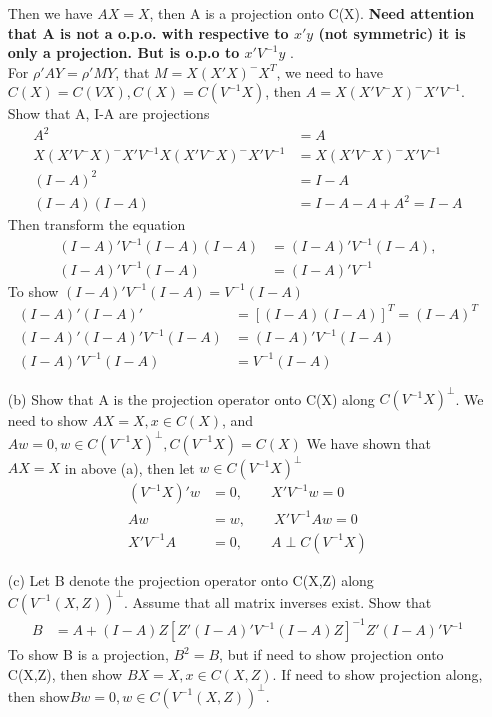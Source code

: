 \begin{itemize}
Then we have $AX = X$, then A is a projection onto C(X). \textbf{Need attention that A is not a o.p.o. with respective to $x'y$ (not symmetric) it is only a projection. But is o.p.o to $x' V^{-1}y$ }.\\
For $\rho'A Y = \rho' MY$, that $M= X(X'X)^{-} X^{T}$, we need to have $C(X) = C(VX), C(X) = C(V^{-1}X)$, then $A =X(X'V^-X)^-X'V^{-1}$.\\
Show that A, I-A are projections
\begin{align*}
A^2 &= A\\
X(X'V^-X)^-X'V^{-1} X(X'V^-X)^-X'V^{-1} &= X(X'V^-X)^-X'V^{-1}\\
(I-A)^2 &= I-A \\
(I-A)(I-A) &= I-A-A + A^2 = I-A
\end{align*}  
Then transform the equation
\begin{align*}
(I-A)'V^{-1}(I-A)(I-A) &= (I-A)'V^{-1}(I-A), \\
(I-A)'V^{-1}(I-A) &= (I-A)'V^{-1} 
\end{align*} 
To show $(I-A)'V^{-1}(I-A) = V^{-1}(I-A)$
\begin{align*}
(I-A)'(I-A)' &= [(I-A)(I-A)]^T = (I-A)^T\\
(I-A)'(I-A)'V^{-1}(I-A) &= (I-A)'V^{-1}(I-A) \\
(I-A)'V^{-1}(I-A) &= V^{-1}(I-A) 
\end{align*} 
\item[(b)] Show that A is the projection operator onto C(X) along $C(V^{-1} X)^{\perp}$.
We need to show $AX=X, x \in C(X) $, and $Aw = 0, w \in C(V^{-1} X)^{\perp}, C(V^{-1}X) = C(X)$
We have shown that $AX=X$ in above (a), then let $w \in C(V^{-1} X)^{\perp}$
\begin{align*}
(V^{-1} X)'w &= 0, \qquad X' V^{-1} w = 0\\
Aw & =w, \qquad  X' V^{-1} A w = 0 \\
X' V^{-1} A &= 0, \qquad A \perp  C(V^{-1} X)
\end{align*}
\item[(c)]Let B denote the projection operator onto C(X,Z) along $C(V^{-1} (X,Z))^{\perp}$.
Assume that all matrix inverses exist. Show that
\begin{align*}
B &= A + (I-A)Z [Z'(I-A)' V^{-1} (I-A)Z]^{-1} Z'(I-A)'V^{-1}
\end{align*}
To show B is a projection, $B^2 = B$, but if need to show projection onto C(X,Z), then show $BX=X, x \in C(X,Z)$. If need to show projection along, then show$ Bw = 0, w \in C(V^{-1} (X,Z))^{\perp}$. 
\begin{align*}

\end{align*}
\end{itemize}
